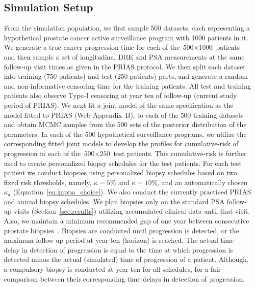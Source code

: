 \subsection{Simulation Setup}
From the simulation population, we first sample 500 datasets, each representing a hypothetical prostate cancer active surveillance program with 1000 patients in it. We generate a true cancer progression time for each of the ${\mbox{500} \times \mbox{1000}}$ patients and then sample a set of longitudinal DRE and PSA measurements at the same follow-up visit times as given in the PRIAS protocol. We then split each dataset into training (750 patients) and test (250 patients) parts, and generate a random and non‐informative censoring time for the training patients. All test and training patients also observe Type-I censoring at year ten of follow-up (current study period of PRIAS). We next fit a joint model of the same specification as the model fitted to PRIAS (Web-Appendix~B), to each of the 500 training datasets and obtain MCMC samples from the 500 sets of the posterior distribution of the parameters. In each of the 500 hypothetical surveillance programs, we utilize the corresponding fitted joint models to develop the profiles for cumulative-risk of progression in each of the ${\mbox{500} \times \mbox{250}}$ test patients. This cumulative-risk is further used to create personalized biopsy schedules for the test patients. For each test patient we conduct biopsies using personalized biopsy schedules based on two fixed risk thresholds, namely, $\kappa=5\%$ and $\kappa=10\%$, and an automatically chosen $\kappa_a$ (Equation~\ref{eq:kappa_choice}). We also conduct the currently practiced PRIAS and annual biopsy schedules. We plan biopsies only on the standard PSA follow-up visits (Section~\ref{sec:results}) utilizing accumulated clinical data until that visit. Also, we maintain a minimum recommended gap of one year between consecutive prostate biopsies~\citep{bokhorst2015compliance}. Biopsies are conducted until progression is detected, or the maximum follow-up period at year ten (horizon) is reached. The actual time delay in detection of progression is equal to the time at which progression is detected minus the actual (simulated) time of progression of a patient. Although, a compulsory biopsy is conducted at year ten for all schedules, for a fair comparison between their corresponding time delays in detection of progression.

